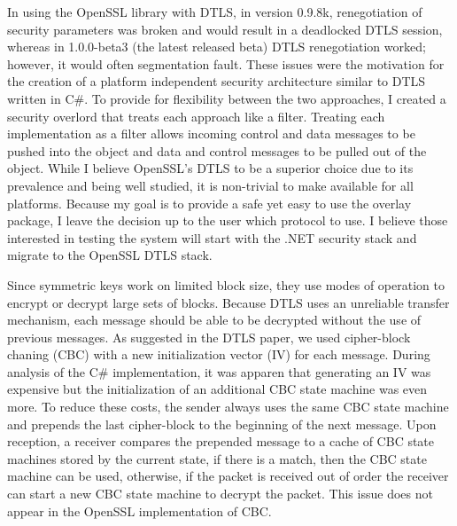 In using the OpenSSL library with DTLS, in version 0.9.8k, renegotiation of
security parameters  was broken and would result in a deadlocked DTLS session,
whereas in 1.0.0-beta3 (the latest released beta) DTLS renegotiation worked;
however, it would often segmentation fault.  These issues were the motivation
for the creation of a platform independent security architecture similar to
DTLS written in C\#.  To provide for flexibility between the two approaches,
I created a security overlord that treats each approach like a filter.
Treating each implementation as a filter allows incoming control and data
messages to be pushed into the object and data and control messages to be
pulled out of the object.  While I believe OpenSSL's DTLS to be a superior
choice due to its prevalence and being well studied, it is non-trivial to make
available for all platforms.  Because my goal is to provide a safe yet easy to
use the overlay package, I leave the decision up to the user which protocol to
use.   I believe those interested in testing the system will start with the
.NET security stack and migrate to the OpenSSL DTLS stack.



Since symmetric keys work on limited block size, they use modes of operation
to encrypt or decrypt large sets of blocks.  Because DTLS uses an unreliable
transfer mechanism, each message should be able to be decrypted without the use
of previous messages.  As suggested in the DTLS paper, we used cipher-block
chaning (CBC) with a new initialization vector (IV) for each message.  During
analysis of the C\# implementation, it was apparen that generating an IV was
expensive but the initialization of an additional CBC state machine was even
more.  To reduce these costs, the sender always uses the same CBC state machine
and prepends the last cipher-block to the beginning of the next message.  Upon
reception, a receiver compares the prepended message to a cache of CBC state
machines stored by the current state, if there is a match, then the CBC state
machine can be used, otherwise, if the packet is received out of order the
receiver can start a new CBC state machine to decrypt the packet.  This issue
does not appear in the OpenSSL implementation of CBC.

